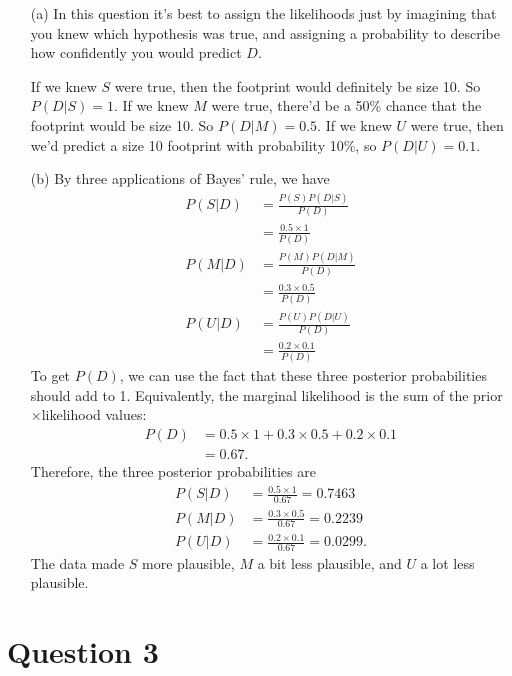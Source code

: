 \documentclass[a4paper, 12pt]{article}
\begin{document}
\begin{enumerate}
\item[(a)] In this question it's best to assign the likelihoods just by imagining that you knew
           which hypothesis was true, and assigning a probability to describe how confidently
           you would predict $D$.

           If we knew $S$ were true, then the footprint would definitely be size 10. So
           $P(D|S) = 1$. If we knew $M$ were true, there'd be a 50\% chance that the
           footprint would be size 10. So $P(D|M) = 0.5$. If we knew $U$ were true, then
           we'd predict a size 10 footprint with probability 10\%, so $P(D|U)=0.1$.

\item[(b)] By three applications of Bayes' rule, we have
\begin{align}
P(S|D) &= \frac{P(S)P(D|S)}{P(D)} \\
       &= \frac{0.5 \times 1}{P(D)} \\
P(M|D) &= \frac{P(M)P(D|M)}{P(D)} \\
       &= \frac{0.3 \times 0.5}{P(D)} \\
P(U|D) &= \frac{P(U)P(D|U)}{P(D)} \\
       &= \frac{0.2 \times 0.1}{P(D)}
\end{align}
To get $P(D)$, we can use the fact that these three posterior probabilities should add to 1.
Equivalently, the marginal likelihood is the sum of the prior$\times$likelihood values:
\begin{align}
P(D) &= 0.5 \times 1 + 0.3 \times 0.5 + 0.2 \times 0.1\\
     &= 0.67.
\end{align}
Therefore, the three posterior probabilities are
\begin{align}
P(S|D) &= \frac{0.5 \times 1}{0.67} = 0.7463\\
P(M|D) &= \frac{0.3 \times 0.5}{0.67} = 0.2239\\
P(U|D) &= \frac{0.2 \times 0.1}{0.67} = 0.0299.
\end{align}
The data made $S$ more plausible, $M$ a bit less plausible, and $U$ a lot less plausible.

\end{enumerate}


\section*{Question 3}
\end{document}
